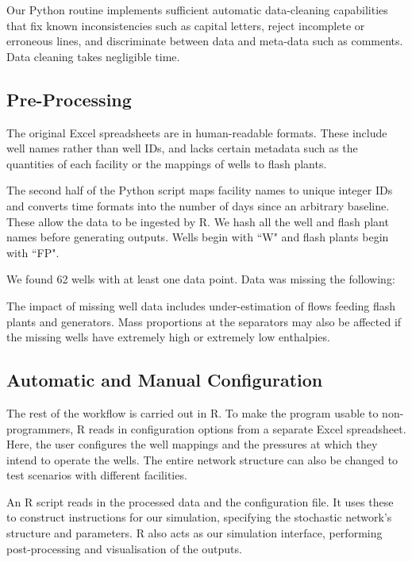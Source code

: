 \documentclass[a4paper, 12pt]{article}
\begin{document}
Our Python routine implements sufficient automatic data-cleaning capabilities that fix known inconsistencies such as capital letters, reject incomplete or erroneous lines, and discriminate between data and meta-data such as comments. Data cleaning takes negligible time.

\subsection{Pre-Processing}
The original Excel spreadsheets are in human-readable formats. These include well names rather than well IDs, and lacks certain metadata such as the quantities of each facility or the mappings of wells to flash plants.

The second half of the Python script maps facility names to unique integer IDs and converts time formats into the number of days since an arbitrary baseline. These allow the data to be ingested by R. We hash all the well and flash plant names before generating outputs. Wells begin with ``W" and flash plants begin with ``FP".

We found 62 wells with at least one data point. Data was missing the following:


The impact of missing well data includes under-estimation of flows feeding flash plants and generators. Mass proportions at the separators may also be affected if the missing wells have extremely high or extremely low enthalpies.

\subsection{Automatic and Manual Configuration}
The rest of the workflow is carried out in R. To make the program usable to non-programmers, R reads in configuration options from a separate Excel spreadsheet. Here, the user configures the well mappings and the pressures at which they intend to operate the wells. The entire network structure can also be changed to test scenarios with different facilities.

An R script reads in the processed data and the configuration file. It uses these to construct instructions for our simulation, specifying the stochastic network's structure and parameters. R also acts as our simulation interface, performing post-processing and visualisation of the outputs.

\end{document}
